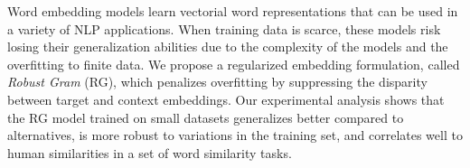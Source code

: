 Word embedding models learn vectorial word representations that can be used in a variety of NLP applications. When training data is scarce, these models risk losing their generalization abilities due to the complexity of the models and the overfitting to finite data. We propose a regularized embedding formulation, called \emph{Robust Gram} (RG), which penalizes overfitting by suppressing the disparity between target and context embeddings. Our experimental analysis shows that the RG model trained on small datasets generalizes better compared to alternatives, is more robust to variations in the training set, and correlates well to human similarities in a set of word similarity tasks.
